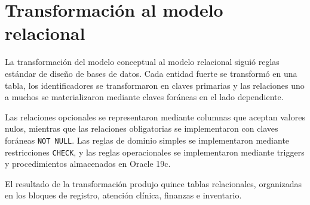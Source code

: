 \section{Transformación al modelo relacional}

La transformación del modelo conceptual al modelo relacional siguió reglas estándar de diseño de bases de datos. Cada entidad fuerte se transformó en una tabla, los identificadores se transformaron en claves primarias y las relaciones uno a muchos se materializaron mediante claves foráneas en el lado dependiente.

Las relaciones opcionales se representaron mediante columnas que aceptan valores nulos, mientras que las relaciones obligatorias se implementaron con claves foráneas \texttt{NOT NULL}. Las reglas de dominio simples se implementaron mediante restricciones \texttt{CHECK}, y las reglas operacionales se implementaron mediante triggers y procedimientos almacenados en Oracle 19c.

El resultado de la transformación produjo quince tablas relacionales, organizadas en los bloques de registro, atención clínica, finanzas e inventario.
